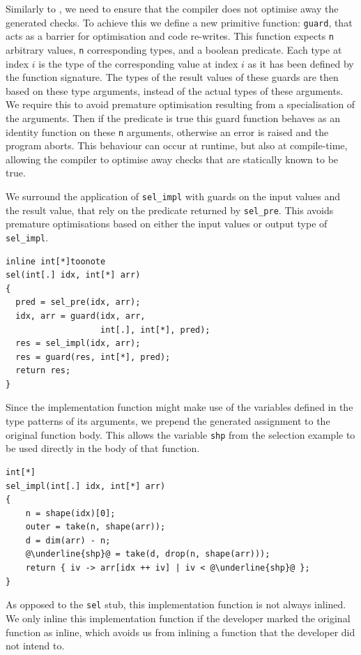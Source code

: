 \documentclass[sigconf,screen]{acmart}
\begin{document}
Similarly to \cite{sac-contracts}, we need to ensure that the compiler does not optimise away the generated checks.
To achieve this we define a new primitive function: \texttt{guard}, that acts as a barrier for optimisation and code re-writes.
This function expects \texttt{n} arbitrary values, \texttt{n} corresponding types, and a boolean predicate.
Each type at index $i$ is the type of the corresponding value at index $i$ as it has been defined by the function signature.
The types of the result values of these guards are then based on these type arguments, instead of the actual types of these arguments.
We require this to avoid premature optimisation resulting from a specialisation of the arguments.
Then if the predicate is true this guard function behaves as an identity function on these \texttt{n} arguments, otherwise an error is raised and the program aborts.
This behaviour can occur at runtime, but also at compile-time, allowing the compiler to optimise away checks that are statically known to be true.

We surround the application of \texttt{sel\_impl} with guards on the input values and the result value, that rely on the predicate returned by \texttt{sel\_pre}.
This avoids premature optimisations based on either the input values or output type of \texttt{sel\_impl}.

\begin{lstlisting}
inline int[*]toonote
sel(int[.] idx, int[*] arr)
{
  pred = sel_pre(idx, arr);
  idx, arr = guard(idx, arr,
                   int[.], int[*], pred);
  res = sel_impl(idx, arr);
  res = guard(res, int[*], pred);
  return res;
}
\end{lstlisting}

Since the implementation function might make use of the variables defined in the type patterns of its arguments, we prepend the generated assignment to the original function body.
This allows the variable \texttt{shp} from the selection example to be used directly in the body of that function.

\begin{lstlisting}[escapechar=@]
int[*]
sel_impl(int[.] idx, int[*] arr)
{
    n = shape(idx)[0];
    outer = take(n, shape(arr));
    d = dim(arr) - n;
    @\underline{shp}@ = take(d, drop(n, shape(arr)));
    return { iv -> arr[idx ++ iv] | iv < @\underline{shp}@ };
}
\end{lstlisting}

As opposed to the \texttt{sel} stub, this implementation function is not always inlined.
We only inline this implementation function if the developer marked the original function as inline, which avoids us from inlining a function that the developer did not intend to.
\end{document}

